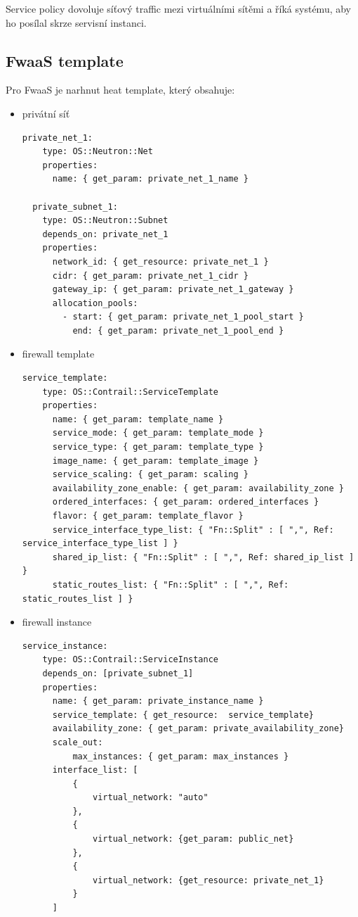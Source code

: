 Service policy dovoluje síťový traffic mezi virtuálními sítěmi a říká systému, aby ho posílal skrze servisní instanci.



\subsection{FwaaS template}

Pro FwaaS je narhnut heat template, který obsahuje:

\begin{itemize}

\item privátní síť


\begin{lstlisting}[caption=Privátní síť]
  private_net_1:
    type: OS::Neutron::Net
    properties:
      name: { get_param: private_net_1_name } 

  private_subnet_1:
    type: OS::Neutron::Subnet
    depends_on: private_net_1
    properties:
      network_id: { get_resource: private_net_1 }
      cidr: { get_param: private_net_1_cidr }
      gateway_ip: { get_param: private_net_1_gateway }
      allocation_pools:
        - start: { get_param: private_net_1_pool_start }
          end: { get_param: private_net_1_pool_end }
\end{lstlisting}


\item firewall template

\begin{lstlisting}[caption=Firewall servisní instance]
service_template:
    type: OS::Contrail::ServiceTemplate
    properties:
      name: { get_param: template_name }
      service_mode: { get_param: template_mode }
      service_type: { get_param: template_type }
      image_name: { get_param: template_image }
      service_scaling: { get_param: scaling }
      availability_zone_enable: { get_param: availability_zone }
      ordered_interfaces: { get_param: ordered_interfaces }
      flavor: { get_param: template_flavor }
      service_interface_type_list: { "Fn::Split" : [ ",", Ref: service_interface_type_list ] }
      shared_ip_list: { "Fn::Split" : [ ",", Ref: shared_ip_list ] }
      static_routes_list: { "Fn::Split" : [ ",", Ref: static_routes_list ] }

\end{lstlisting}

\item firewall instance
\begin{lstlisting}[caption=Privátní síť]
 service_instance:
    type: OS::Contrail::ServiceInstance
    depends_on: [private_subnet_1]
    properties:
      name: { get_param: private_instance_name }
      service_template: { get_resource:  service_template}
      availability_zone: { get_param: private_availability_zone}
      scale_out: 
          max_instances: { get_param: max_instances }
      interface_list: [
          {
              virtual_network: "auto"
          },
          {
              virtual_network: {get_param: public_net}
          },
          {
              virtual_network: {get_resource: private_net_1}
          }
      ]
\end{lstlisting}



\end{itemize}
